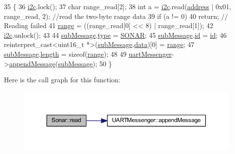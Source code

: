 \begin{DoxyCode}
35                  \{
36     \hyperlink{class_sonar_ae6be174d7fc69e27ae5d932b26a5a003}{i2c}.lock();
37     \textcolor{keywordtype}{char} range\_read[2];
38     \textcolor{keywordtype}{int} a = \hyperlink{class_sonar_ae6be174d7fc69e27ae5d932b26a5a003}{i2c}.read(\hyperlink{class_sonar_aa42fef5da4ff8d80353143a74eff2ae2}{address} | 0x01, range\_read, 2); \textcolor{comment}{//read the two-byte range data}
39     \textcolor{keywordflow}{if} (a != 0)
40         \textcolor{keywordflow}{return}; \textcolor{comment}{// Reading failed}
41     \hyperlink{class_sonar_a6b0f78a9151925ca61fe54c852c195bd}{range} = ((range\_read[0] << 8) | range\_read[1]);
42     \hyperlink{class_sonar_ae6be174d7fc69e27ae5d932b26a5a003}{i2c}.unlock();
43 
44     \hyperlink{class_sonar_a08f09f7abe342846e6e97b8dd76d623b}{subMessage}.\hyperlink{struct_sub_message_a064f1d26d553da776dc749d37a18a499}{type} = \hyperlink{_sub_message_8h_a81f78fc173dedefe5a049c0aa3eed2c0a4cc68226cf454df7dd46f74f2a18d240}{SONAR};
45     \hyperlink{class_sonar_a08f09f7abe342846e6e97b8dd76d623b}{subMessage}.\hyperlink{struct_sub_message_af3acc450c0686d7a9d15ccd9d548cb6d}{id} = \hyperlink{class_abstract_component_a9c9c548149681b1a1dd935e66ed5dd11}{id};
46     \textcolor{keyword}{reinterpret\_cast<}uint16\_t *\textcolor{keyword}{>}(\hyperlink{class_sonar_a08f09f7abe342846e6e97b8dd76d623b}{subMessage}.\hyperlink{struct_sub_message_a7d923c5cdaa380c27d7c4cf60ea7c1be}{data})[0] = \hyperlink{class_sonar_a6b0f78a9151925ca61fe54c852c195bd}{range};
47     \hyperlink{class_sonar_a08f09f7abe342846e6e97b8dd76d623b}{subMessage}.\hyperlink{struct_sub_message_a276e06f5335ca7857c21ac8c0e51bd6d}{length} = \textcolor{keyword}{sizeof}(\hyperlink{class_sonar_a6b0f78a9151925ca61fe54c852c195bd}{range});
48 
49     \hyperlink{class_sonar_a63b5d2455e9278c9d3c6dded215789f6}{uartMessenger}->\hyperlink{class_u_a_r_t_messenger_ada0967869e320c236a211b405abf128a}{appendMessage}(\hyperlink{class_sonar_a08f09f7abe342846e6e97b8dd76d623b}{subMessage});
50 \}
\end{DoxyCode}
Here is the call graph for this function\+:\nopagebreak
\begin{figure}[H]
\begin{center}
\leavevmode
\includegraphics[width=350pt]{class_sonar_af7a8bb36d925d164b31ff271f9006dc7_cgraph}
\end{center}
\end{figure}
